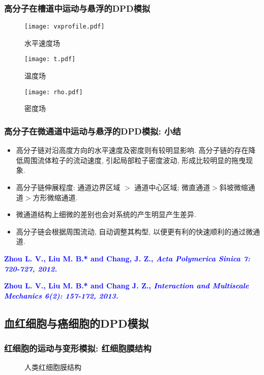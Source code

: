 \begin{frame}
\frametitle{高分子在槽道中运动与悬浮的DPD模拟}
\note{\textcolor{red}{295-310s}}
\begin{figure}
\centering
\texttt{[image: vxprofile.pdf]}
\vspace{-2em}
\caption{水平速度场}
\texttt{[image: t.pdf]}
\vspace{-2em}
\caption{温度场}
\texttt{[image: rho.pdf]}
\vspace{-2em}
\caption{密度场}
\end{figure}
\end{frame}


\begin{frame}
\frametitle{高分子在微通道中运动与悬浮的DPD模拟: 小结}
\note{\textcolor{red}{310-330s}}
\begin{itemize}
\item 高分子链对沿高度方向的水平速度及密度则有较明显影响. 高分子链的存在降低周围流体粒子的流动速度, 引起局部粒子密度波动, 形成比较明显的拖曳现象. 
\item 高分子链伸展程度: 通道边界区域 $>$ 通道中心区域; 
微直通道$>$斜坡微缩通道$>$方形微缩通道.
\item 微通道结构上细微的差别也会对系统的产生明显产生差异. %
\item 高分子链会根据周围流动, 自动调整其构型, 以便更有利的快速顺利的通过微通道.
\end{itemize}

\textcolor{blue}{\scriptsize \bf Zhou L. V., Liu M. B.* and Chang, J. Z., \it{Acta Polymerica Sinica} 7: 720-727, 2012.} 

\textcolor{blue}{\scriptsize \bf Zhou L. V., Liu M. B.* and Chang J. Z., \it{Interaction and Multiscale Mechanics} 6(2): 157-172, 2013.}

\end{frame}



\subsection{血红细胞与癌细胞的DPD模拟}
\begin{frame}
\frametitle{红细胞的运动与变形模拟: 红细胞膜结构}
\note{\textcolor{red}{330-350s}}
\begin{figure}[!htb]
\centering

\caption{\label{fig:RBCstructure} 人类红细胞膜结构}
\end{figure}
\end{frame}

